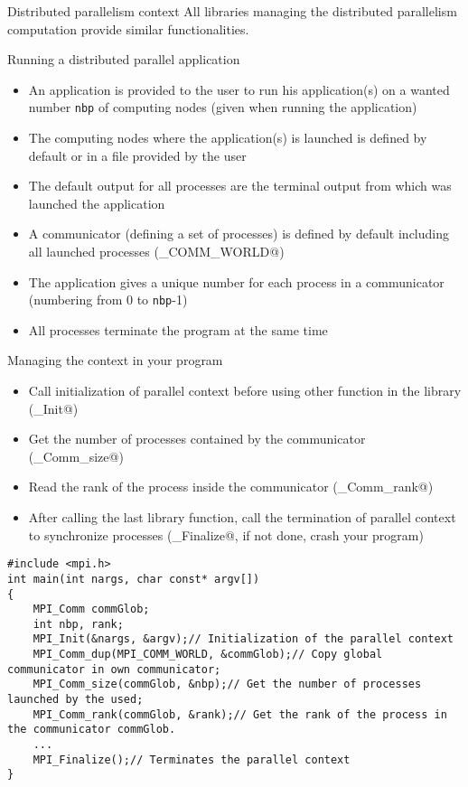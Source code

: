 \documentclass[compress,10pt,aspectratio=169]{beamer}
\begin{document}
\begin{frame}[fragile]{Distributed parallelism context}
    \small
    All libraries managing the distributed parallelism computation provide similar functionalities.

    \begin{block}{\small Running a distributed parallel application}
        \begin{itemize}
            \scriptsize
            \item An application is provided to the user to run his application(s) on a wanted number \texttt{nbp} of computing nodes (given when running the application)
            \item The computing nodes where the application(s) is launched is defined by default or in a file provided by the user
            \item The default output for all processes are the terminal output from which was launched the application
            \item A communicator (defining a set of processes) is defined by default including all launched processes (\verb@MPI_COMM_WORLD@)
            \item The application gives a unique number for each process in a communicator (numbering from 0 to \texttt{nbp}-1)
            \item All processes terminate the program at the same time
        \end{itemize}
    \end{block}
\end{frame}

\begin{frame}[fragile]{Managing the context in your program}
    \small
    \begin{itemize}
        \item Call initialization of parallel context before using other function in the library (\verb@MPI_Init@)
        \item Get the number of processes contained by the communicator (\verb@MPI_Comm_size@)
        \item Read the rank of the process inside the communicator (\verb@MPI_Comm_rank@)
        \item After calling the last library function, call the termination of parallel context to synchronize processes (\verb@MPI_Finalize@, if not done, crash your program)
    \end{itemize}

\begin{verbatim}
#include <mpi.h>
int main(int nargs, char const* argv[])
{
    MPI_Comm commGlob;
    int nbp, rank;
    MPI_Init(&nargs, &argv);// Initialization of the parallel context
    MPI_Comm_dup(MPI_COMM_WORLD, &commGlob);// Copy global communicator in own communicator;
    MPI_Comm_size(commGlob, &nbp);// Get the number of processes launched by the used;
    MPI_Comm_rank(commGlob, &rank);// Get the rank of the process in the communicator commGlob.
    ...
    MPI_Finalize();// Terminates the parallel context
}
\end{verbatim}

\end{frame}
\end{document}

